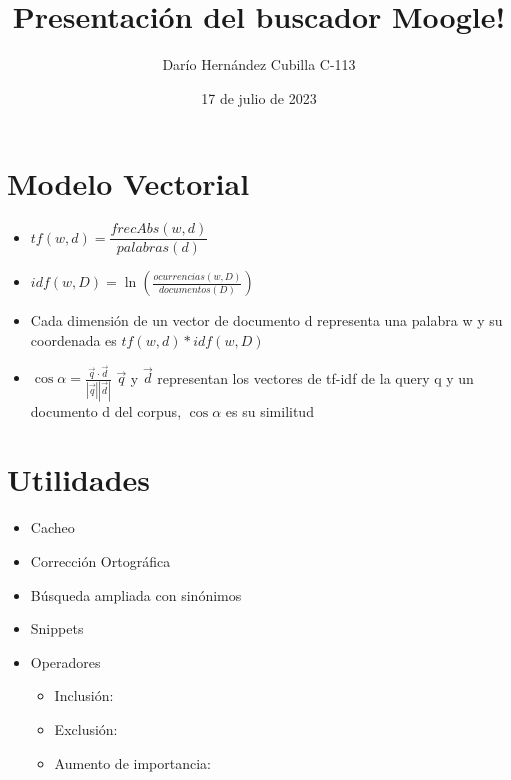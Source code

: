 \documentclass{beamer}
\begin{document}
\title{Presentación del buscador Moogle!}
\author{Darío Hernández Cubilla C-113}
\date{17 de julio de 2023}
\maketitle

\section{Modelo Vectorial}


\begin{frame}

\begin{itemize}
    \item<1-> $ \displaystyle tf(w, d) = \dfrac{frecAbs(w, d)}{palabras(d)}$
    \item<2-> $ \displaystyle idf(w, D) = \ln(\frac{ocurrencias(w, D)}{documentos(D)}) $
    \item <3-> Cada dimensión de un vector de documento d representa una palabra w y su coordenada es $ tf(w, d) * idf(w, D)$ 
    \item<4-> $ \displaystyle \cos{\alpha} = \frac{\vec{q}\cdot\vec{d}}{\left\lvert \vec{q} \right\rvert \left\lvert {\vec{d}} \right\rvert }$
             \newline  $\vec{q}$ y $\vec{d}$ representan los vectores de tf-idf de la query q y un documento d del corpus, $\cos{\alpha}$ es su similitud

\end{itemize}

\end{frame}


\section{Utilidades}

\begin{frame}
    \begin{itemize}
        \item<1-> Cacheo
        \item<2-> Corrección Ortográfica
        \item<3-> Búsqueda ampliada con sinónimos
        \item<4-> Snippets 
        \item<5-> Operadores
        \begin{itemize}
            \item<6-> Inclusión: 
            \item<7-> Exclusión: \color{red}{'!'}
            \item<8-> Aumento de importancia: \color{green}{'*'}
        \end{itemize} 
    \end{itemize}
\end{frame}
\end{document}
